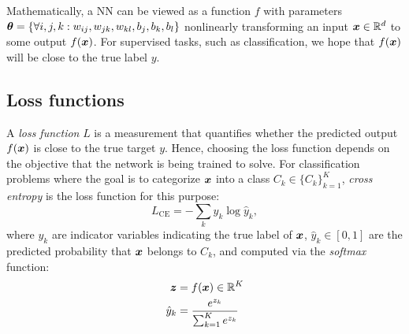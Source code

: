 %




 Mathematically, a NN can be viewed as a function $f$ with parameters $\patvector{\theta} = \{\forall i,j,k : w_{ij}, w_{jk}, w_{kl}, b_j, b_k, b_l \}$  nonlinearly transforming an input $\boldsymbol{x} \in \mathbb{R}^d $ to some output $f(\boldsymbol{x})$. For supervised tasks, such as classification, we hope that $f(\boldsymbol{x})$ will be close to the true label $y$.
%
%
%



\subsection{Loss functions}
A \textit{loss function} $L$  is a measurement that quantifies whether the predicted output $f(\boldsymbol{x})$ is close to the true target $y$. Hence, 
choosing the loss function depends on the objective that the network is being trained to solve. For classification problems where the goal is to categorize $\boldsymbol{x}$ into a class $C_k \in \{ C_k\}_{k=1}^K$, \textit{cross entropy} is the loss function for this purpose:
$$
L_{\text{CE}} = - \sum_{k} y_k \log \hat{y}_k,
$$
where $y_k$ are indicator variables indicating the true label of $\boldsymbol{x}$, $\hat{y}_k \in [0, 1]$ are the predicted probability that $\boldsymbol{x}$ belongs to $C_k$, and computed via the \textit{softmax} function:
\begin{align*}
\patvector{z} &= f(\x) \in \mathbb{R}^{K} \\
\hat{y}_k &= \frac{e^{z_k}}{ \sum_{k=1}^K{e^{z_k}} }
\end{align*}


